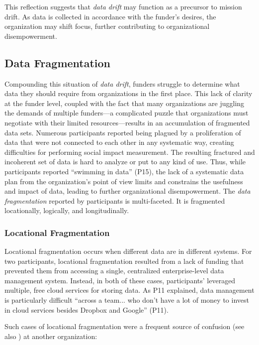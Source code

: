 This reflection suggests that \textit{data drift} may function as a precursor to mission drift. As data is collected in accordance with the funder’s desires, the organization may shift focus, further contributing to organizational disempowerment.

\subsection{Data Fragmentation}

Compounding this situation of \textit{data drift}, funders struggle to determine what data they should require from organizations in the first place. This lack of clarity at the funder level, coupled with the fact that many organizations are juggling the demands of multiple funders---a complicated puzzle that organizations must negotiate with their limited resources---results in an accumulation of fragmented data sets. Numerous participants reported being plagued by a proliferation of data that were not connected to each other in any systematic way, creating difficulties for performing social impact measurement. The resulting fractured and incoherent set of data is hard to analyze or put to any kind of use. Thus, while participants reported “swimming in data” (P15), the lack of a systematic data plan from the organization’s point of view limits and constrains the usefulness and impact of data, leading to further organizational disempowerment. The \textit{data fragmentation} reported by participants is multi-faceted. It is fragmented locationally, logically, and longitudinally.

\subsubsection{Locational Fragmentation}
Locational fragmentation occurs when different data are in different systems. For two participants, locational fragmentation resulted from a lack of funding that prevented them from accessing a single, centralized enterprise-level data management system. Instead, in both of these cases, participants’ leveraged multiple, free cloud services for storing data. As P11 explained, data management is particularly difficult “across a team... who don’t have a lot of money to invest in cloud services besides Dropbox and Google” (P11).

Such cases of locational fragmentation were a frequent source of confusion (see also \citep{Voida2013Turbulence}) at another organization:

